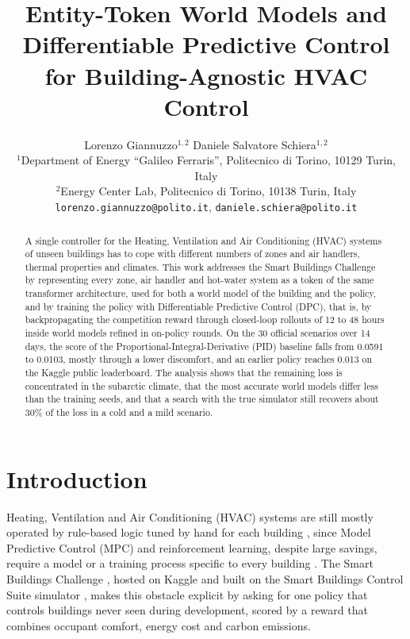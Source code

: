\documentclass{article}
\title{Entity-Token World Models and Differentiable Predictive Control for Building-Agnostic HVAC Control}
\author{%
  Lorenzo Giannuzzo$^{1,2}$ \quad Daniele Salvatore Schiera$^{1,2}$ \\[4pt]
  $^{1}$Department of Energy ``Galileo Ferraris'', Politecnico di Torino, 10129 Turin, Italy \\
  $^{2}$Energy Center Lab, Politecnico di Torino, 10138 Turin, Italy \\
  {\small\texttt{lorenzo.giannuzzo@polito.it}, \texttt{daniele.schiera@polito.it}}
}
\begin{document}
\maketitle

\begin{abstract}
A single controller for the Heating, Ventilation and Air Conditioning (HVAC) systems of unseen buildings has to cope with different numbers of zones and air handlers, thermal properties and climates. This work addresses the Smart Buildings Challenge by representing every zone, air handler and hot-water system as a token of the same transformer architecture, used for both a world model of the building and the policy, and by training the policy with Differentiable Predictive Control (DPC), that is, by backpropagating the competition reward through closed-loop rollouts of 12 to 48 hours inside world models refined in on-policy rounds. On the 30 official scenarios over 14 days, the score of the Proportional-Integral-Derivative (PID) baseline falls from 0.0591 to 0.0103, mostly through a lower discomfort, and an earlier policy reaches 0.013 on the Kaggle public leaderboard. The analysis shows that the remaining loss is concentrated in the subarctic climate, that the most accurate world models differ less than the training seeds, and that a search with the true simulator still recovers about 30\% of the loss in a cold and a mild scenario.
\end{abstract}

\section{Introduction}

Heating, Ventilation and Air Conditioning (HVAC) systems are still mostly operated by rule-based logic tuned by hand for each building \cite{drgona2020mpc,wang2020rl}, since Model Predictive Control (MPC) and reinforcement learning, despite large savings, require a model or a training process specific to every building \cite{pinto2022transfer}. The Smart Buildings Challenge \cite{goldfeder2026smart}, hosted on Kaggle and built on the Smart Buildings Control Suite simulator \cite{goldfeder2024smart}, makes this obstacle explicit by asking for one policy that controls buildings never seen during development, scored by a reward that combines occupant comfort, energy cost and carbon emissions.
\end{document}
